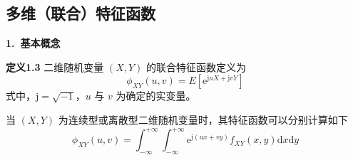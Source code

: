\documentclass[11pt,openany,UTF8]{ctexbook}
\newcommand{\dif}{\mathrm{d}}                      %
\newcommand{\eu}{\mathrm{e}}                       %
\newcommand{\ju}{\mathrm{j}}                       %
\newcommand{\bhead}[1]{\par\medskip\noindent\textbf{#1}\par\smallskip}
\newcommand{\thm}[1]{\par\medskip\noindent\textbf{#1}\quad}
\begin{document}
\subsection{多维（联合\nobreak）特征函数}

\bhead{1.\ 基本概念}

\thm{定义1.3} 二维随机变量 $(X,Y)$ 的联合特征函数定义为
\begin{equation}
\phi_{XY}(u,v)=E\left[\eu^{\ju uX+\ju vY}\right]
\label{eq:1.66}
\end{equation}
式中\nobreak，$\ju=\sqrt{-1}$\nobreak，$u$ 与 $v$ 为确定的实变量\nobreak。

当 $(X,Y)$ 为连续型或离散型二维随机变量时\nobreak，其特征函数可以分别计算如下
\[
\phi_{XY}(u,v)=\int_{-\infty}^{+\infty}\int_{-\infty}^{+\infty}\eu^{\ju(ux+vy)}f_{XY}(x,y)\dif x\dif y
\]


\end{document}
